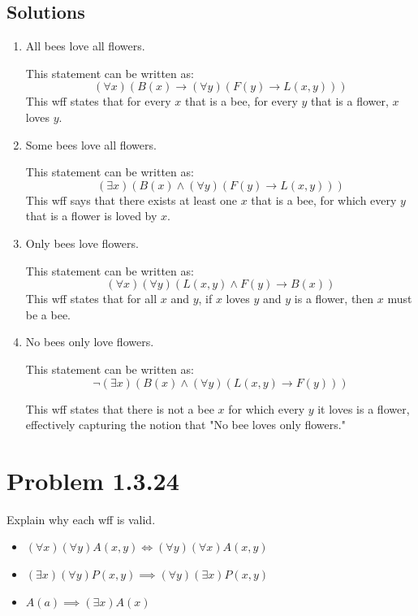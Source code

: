 \documentclass[12pt]{article}
\begin{document}
\subsection*{Solutions}
\begin{enumerate}
    \item[a.] All bees love all flowers.
    
    This statement can be written as:
    \[
    (\forall x)(B(x) \rightarrow (\forall y)(F(y) \rightarrow L(x, y)))
    \]
    This wff states that for every \( x \) that is a bee, for every \( y \) that is a flower, \( x \) loves \( y \).
    
    \item[b.] Some bees love all flowers.
    
    This statement can be written as:
    \[
    (\exists x)(B(x) \land (\forall y)(F(y) \rightarrow L(x, y)))
    \]
    This wff says that there exists at least one \( x \) that is a bee, for which every \( y \) that is a flower is loved by \( x \).
    
    \item[e.] Only bees love flowers.
    
    This statement can be written as:
    \[
    (\forall x)(\forall y)(L(x, y) \land F(y) \rightarrow B(x))
    \]
    This wff states that for all \( x \) and \( y \), if \( x \) loves \( y \) and \( y \) is a flower, then \( x \) must be a bee.

    \item[g.] No bees only love flowers.
    
    This statement can be written as:
    \[
    \lnot (\exists x)(B(x) \land (\forall y)(L(x, y) \rightarrow F(y)))
    \]
    
    This wff states that there is not a bee \( x \) for which every \( y \) it loves is a flower, effectively capturing the notion that "No bee loves only flowers."
\end{enumerate}

\newpage
\section*{Problem 1.3.24}
Explain why each wff is valid.
\begin{itemize}
    \item[a.] \((\forall x)(\forall y)A(x, y) \iff (\forall y)(\forall x) A(x, y)\)
    \item[c.] \((\exists x)(\forall y)P(x, y) \implies (\forall y)(\exists x)P(x, y)\)
    \item[d.] \(A(a) \implies (\exists x)A(x)\)
\end{itemize}
\end{document}
